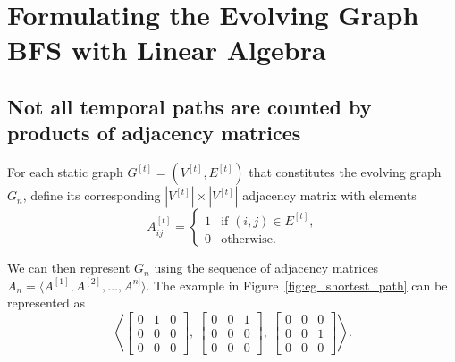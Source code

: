 \documentclass[10pt,conference,compsocconf]{IEEEtran}
\theoremstyle{definition}
\begin{document}
\section{Formulating the Evolving Graph BFS with Linear Algebra}
\label{sec:representation}


\subsection{Not all temporal paths are counted by products of adjacency matrices}
\label{sec:temp-paths-adjac}

For each static graph $G^{[t]} = (V^{[t]}, E^{[t]})$ that constitutes the
evolving graph $G_n$, define its corresponding
$\left\vert V^{[t]}\right\vert \times \left\vert V^{[t]}\right\vert$
adjacency matrix with elements
\begin{equation}
A^{[t]}_{ij} =
\begin{cases}
 1 & \mbox{if $(i,j)\in E^{[t]}$,} \\
 0 & \mbox{otherwise.}
\end{cases}
\label{eqn:adjacency}
\end{equation}

We can then represent $G_n$ using the sequence of adjacency matrices
$A_n = \langle A^{[1]}, A^{[2]}, \ldots, A^{n]}\rangle$. The example in
Figure~\ref{fig:eg_shortest_path} can be represented as
\[
\left\langle
  \begin{bmatrix}
    0 & 1 & 0 \\
    0 & 0 & 0 \\
    0 & 0 & 0
  \end{bmatrix},~
 \begin{bmatrix}
   0 & 0 & 1 \\
   0 & 0 & 0 \\
   0 & 0 & 0
 \end{bmatrix},~
 \begin{bmatrix}
  0 & 0 & 0 \\
  0 & 0 & 1 \\
  0 & 0 & 0
 \end{bmatrix}
\right\rangle.
\]
\end{document}
